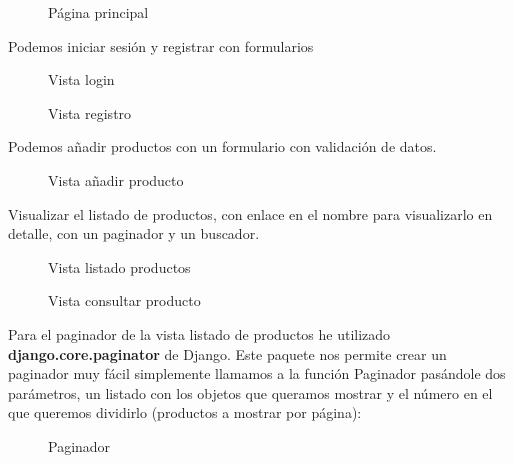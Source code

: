 \begin{figure}[H]
  \centering
  \noindent{}
  \caption{Página principal}
\end{figure}

Podemos iniciar sesión y registrar con formularios 

\begin{figure}[H]
  \centering
  \noindent{}
  \caption{Vista login}
\end{figure}

\begin{figure}[H]
  \centering
  \noindent{}
  \caption{Vista registro}
\end{figure}

Podemos añadir productos con un formulario con validación de datos.

\begin{figure}[H]
  \centering
  \noindent{}
  \caption{Vista añadir producto}
\end{figure}

Visualizar el listado de productos, con enlace en el nombre para visualizarlo en detalle, con un paginador y un buscador.

\begin{figure}[H]
  \centering
  \noindent{}
  \caption{Vista listado productos}
\end{figure}

\begin{figure}[H]
  \centering
  \noindent{}
  \caption{Vista consultar producto}
\end{figure}

Para el paginador de la vista listado de productos he utilizado \textbf{django.core.paginator} de Django. Este paquete nos permite crear 
un paginador muy fácil simplemente llamamos a la función Paginador pasándole dos parámetros, un listado con los objetos que 
queramos mostrar y el número en el que queremos dividirlo (productos a mostrar por página):

\begin{figure}[H]
  \centering
  \noindent{}
  \caption{Paginador}
\end{figure}

